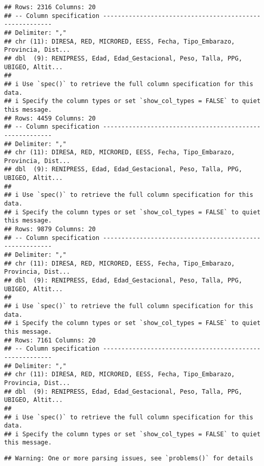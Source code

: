 \documentclass[
]{article}
\begin{document}
\begin{verbatim}
## Rows: 2316 Columns: 20
## -- Column specification --------------------------------------------------------
## Delimiter: ","
## chr (11): DIRESA, RED, MICRORED, EESS, Fecha, Tipo_Embarazo, Provincia, Dist...
## dbl  (9): RENIPRESS, Edad, Edad_Gestacional, Peso, Talla, PPG, UBIGEO, Altit...
## 
## i Use `spec()` to retrieve the full column specification for this data.
## i Specify the column types or set `show_col_types = FALSE` to quiet this message.
## Rows: 4459 Columns: 20
## -- Column specification --------------------------------------------------------
## Delimiter: ","
## chr (11): DIRESA, RED, MICRORED, EESS, Fecha, Tipo_Embarazo, Provincia, Dist...
## dbl  (9): RENIPRESS, Edad, Edad_Gestacional, Peso, Talla, PPG, UBIGEO, Altit...
## 
## i Use `spec()` to retrieve the full column specification for this data.
## i Specify the column types or set `show_col_types = FALSE` to quiet this message.
## Rows: 9879 Columns: 20
## -- Column specification --------------------------------------------------------
## Delimiter: ","
## chr (11): DIRESA, RED, MICRORED, EESS, Fecha, Tipo_Embarazo, Provincia, Dist...
## dbl  (9): RENIPRESS, Edad, Edad_Gestacional, Peso, Talla, PPG, UBIGEO, Altit...
## 
## i Use `spec()` to retrieve the full column specification for this data.
## i Specify the column types or set `show_col_types = FALSE` to quiet this message.
## Rows: 7161 Columns: 20
## -- Column specification --------------------------------------------------------
## Delimiter: ","
## chr (11): DIRESA, RED, MICRORED, EESS, Fecha, Tipo_Embarazo, Provincia, Dist...
## dbl  (9): RENIPRESS, Edad, Edad_Gestacional, Peso, Talla, PPG, UBIGEO, Altit...
## 
## i Use `spec()` to retrieve the full column specification for this data.
## i Specify the column types or set `show_col_types = FALSE` to quiet this message.
\end{verbatim}

\begin{verbatim}
## Warning: One or more parsing issues, see `problems()` for details
\end{verbatim}
\end{document}
